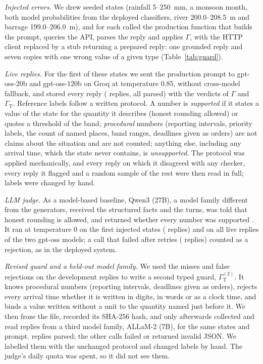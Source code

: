 \documentclass[conference]{IEEEtran}
\begin{document}
\textit{Injected errors.} We drew \GuardCtx{} seeded states (rainfall 5--250~mm, a monsoon month, both model probabilities from the deployed classifiers, river 200.0--208.5~m and barrage 199.0--206.0~m), and for each called the production function that builds the prompt, queries the API, parses the reply and applies $\Gamma$, with the HTTP client replaced by a stub returning a prepared reply: one grounded reply and seven copies with one wrong value of a given type (Table~\ref{tab:guard}).

\textit{Live replies.} For the first \LiveStates{} of these states we sent the production prompt to gpt-oss-20b and gpt-oss-120b on Groq at temperature 0.85, without cross-model fallback, and stored every reply (\LiveN{} replies, all parsed) with the verdicts of $\Gamma$ and $\Gamma_{\mathrm{T}}$. Reference labels follow a written protocol. A number is \emph{supported} if it states a value of the state for the quantity it describes (honest rounding allowed) or quotes a threshold of the band; \emph{procedural} numbers (reporting intervals, priority labels, the count of named places, band ranges, deadlines given as orders) are not claims about the situation and are not counted; anything else, including any arrival time, which the state never contains, is \emph{unsupported}. The protocol was applied mechanically, and every reply on which it disagreed with any checker, every reply it flagged and a random sample of the rest were then read in full; \LiveOverrides{} labels were changed by hand.

\textit{LLM judge.} As a model-based baseline, Qwen3 (27B), a model family different from the generators, received the structured facts and the turns, was told that honest rounding is allowed, and returned whether every number was supported \cite{Zheng2023}. It ran at temperature 0 on the first \JudgeInjStates{} injected states (\JudgeInjItems{} replies) and on all \LiveJudN{} live replies of the two gpt-oss models; a call that failed after retries (\LiveJudgeNone{} replies) counted as a rejection, as in the deployed system.

\textit{Revised guard and a held-out model family.} We used the misses and false rejections on the \LiveN{} development replies to write a second typed guard, $\Gamma_{\mathrm{T}}^{(2)}$. It knows procedural numbers (reporting intervals, deadlines given as orders), rejects every arrival time whether it is written in digits, in words or as a clock time, and binds a value written without a unit to the quantity named just before it. We then froze the file, recorded its SHA-256 hash, and only afterwards collected and read replies from a third model family, ALLaM-2 (7B), for the same \HoStates{} states and prompt. \HoN{} replies parsed; the other \HoParseFail{} calls failed or returned invalid JSON. We labelled them with the unchanged protocol and changed \HoOverrides{} labels by hand. The judge's daily quota was spent, so it did not see them.
\end{document}
